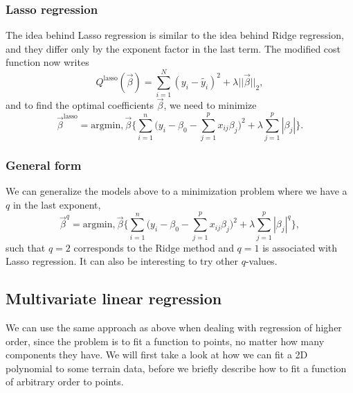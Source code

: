 \subsubsection{Lasso regression} \label{sec:lasso}
The idea behind Lasso regression is similar to the idea behind Ridge regression, and they differ only by the exponent factor in the last term. The modified cost function now writes
\begin{equation}
Q^{\text{lasso}}(\vec{\beta})=\sum_{i=1}^N(y_i-\tilde{y_i})^2+\lambda||\vec{\beta}||_2,
\end{equation}
and to find the optimal coefficients $\vec{\beta}$, we need to minimize
\begin{equation}
\vec{\beta}^{\text{lasso}}=\text{argmin},\vec{\beta}\bigg\{\sum_{i=1}^{n}\Big(y_i-\beta_0-\sum_{j=1}^px_{ij}\beta_j\Big)^2+\lambda\sum_{j=1}^p|\beta_j|\bigg\}.
\end{equation}

\subsubsection{General form} \label{sec:general}
We can generalize the models above to a minimization problem where we have a $q$ in the last exponent, 
\begin{equation}
\vec{\beta}^q=\text{argmin},\vec{\beta}\bigg\{\sum_{i=1}^{n}\Big(y_i-\beta_0-\sum_{j=1}^px_{ij}\beta_j\Big)^2+\lambda\sum_{j=1}^p|\beta_j|^q\bigg\},
\end{equation}
such that $q=2$ corresponds to the Ridge method and $q=1$ is associated with Lasso regression. It can also be interesting to try other $q$-values.

\subsection{Multivariate linear regression} \label{sec:higher_reg}
We can use the same approach as above when dealing with regression of higher order, since the problem is to fit a function to points, no matter how many components they have. We will first take a look at how we can fit a 2D polynomial to some terrain data, before we briefly describe how to fit a function of arbitrary order to points.

